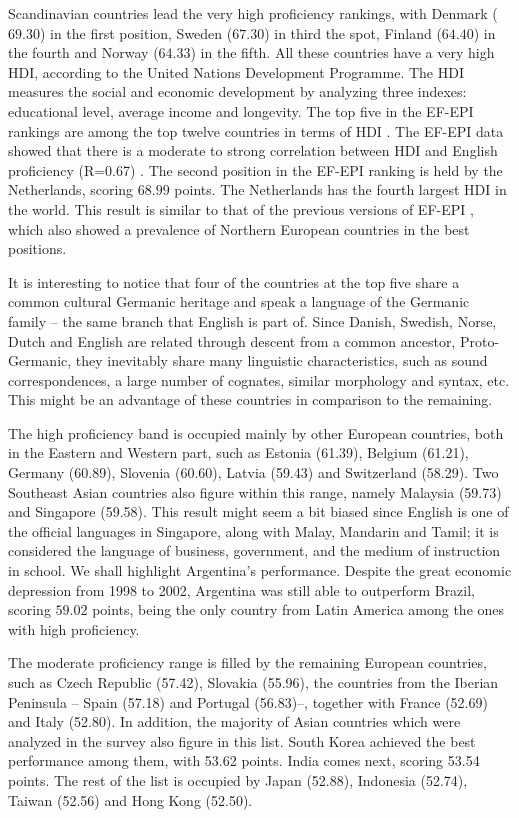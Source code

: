 Scandinavian countries lead the very high proficiency rankings, with Denmark ($69.30$) in the first position, Sweden ($67.30$) in third the spot, Finland ($64.40$) in the fourth and Norway ($64.33$) in the fifth. All these countries have a very high \ac{HDI}, according to the United Nations Development Programme. The \ac{HDI} measures the social and economic development by analyzing three indexes: educational level, average income and longevity. The top five in the \ac{EF-EPI} rankings are among the top twelve countries in terms of \ac{HDI} \cite{HDI2014}. The \ac{EF-EPI} data showed that there is a moderate to strong correlation between \ac{HDI} and English proficiency (R=0.67) \cite{EF2014}. The second position in the \ac{EF-EPI} ranking is held by the Netherlands, scoring $68.99$ points. The Netherlands has the fourth largest \ac{HDI} in the world. This result is similar to that of the previous versions of \ac{EF-EPI} \cite{EF2013, EF2012, EF2011}, which also showed a prevalence of Northern European countries in the best positions.

It is interesting to notice that four of the countries at the top five share a common cultural Germanic heritage and speak a language of the Germanic family -- the same branch that English is part of. Since Danish, Swedish, Norse, Dutch and English are related through descent from a common ancestor, Proto-Germanic, they inevitably share many linguistic characteristics, such as sound correspondences, a large number of cognates, similar morphology and syntax, etc. This might be an advantage of these countries in comparison to the remaining.

The high proficiency band is occupied mainly by other European countries, both in the Eastern and Western part, such as Estonia (61.39), Belgium (61.21), Germany (60.89), Slovenia (60.60), Latvia (59.43) and Switzerland (58.29). Two Southeast Asian countries also figure within this range, namely Malaysia (59.73) and Singapore (59.58). This result might seem a bit biased since English is one of the official languages in Singapore, along with Malay, Mandarin and Tamil; it is considered the language of business, government, and the medium of instruction in school. We shall highlight Argentina's performance. Despite the great economic depression from 1998 to 2002, Argentina was still able to outperform Brazil, scoring $59.02$ points, being the only country from Latin America among the ones with high proficiency. 

The moderate proficiency range is filled by the remaining European countries, such as Czech Republic (57.42), Slovakia (55.96), the countries from the Iberian Peninsula -- Spain (57.18) and Portugal (56.83)--, together with France (52.69) and Italy (52.80). In addition, the majority of Asian countries which were analyzed in the survey also figure in this list. South Korea achieved the best performance among them, with 53.62 points. India comes next, scoring 53.54 points. The rest of the list is occupied by Japan (52.88), Indonesia (52.74), Taiwan (52.56) and Hong Kong (52.50).

